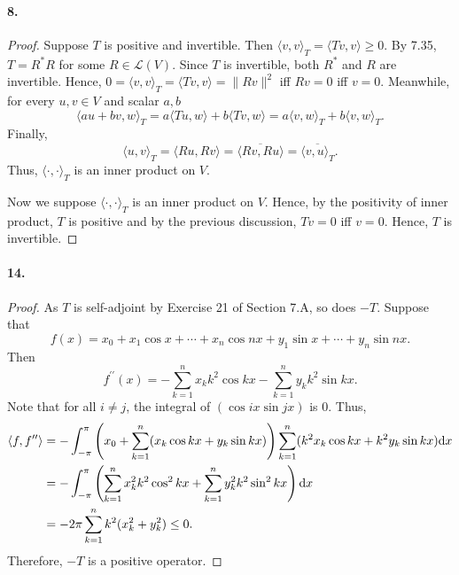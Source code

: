   \paragraph{8.}
  \begin{proof}
    Suppose $T$ is positive and invertible. Then $\langle v,v\rangle_T=\langle
    Tv,v\rangle\ge 0$. By 7.35, $T=R^*R$ for some $R\in\mathcal{L}(V)$. Since
    $T$ is invertible, both $R^*$ and $R$ are invertible. Hence, $0=\langle v,v
    \rangle_T=\langle Tv,v\rangle=\|Rv\|^2$ iff $Rv=0$ iff $v=0$. Meanwhile,
    for every $u,v\in V$ and scalar $a,b$
    \[
      \langle au+bv,w\rangle_T = a\langle Tu,w\rangle + b\langle Tv,w\rangle = 
      a\langle v,w\rangle_T + b\langle v,w\rangle_T.
    \]
    Finally, 
    \[
      \langle u,v\rangle_T = \langle Ru,Rv\rangle = 
      \overline{\langle Rv,Ru\rangle} = \overline{\langle v,u\rangle_T}.
    \]
    Thus, $\langle\cdot,\cdot\rangle_T$ is an inner product on $V$.\par
    Now we suppose $\langle\cdot,\cdot\rangle_T$ is an inner product on $V$.
    Hence, by the positivity of inner product, $T$ is positive and by the 
    previous discussion, $Tv=0$ iff $v=0$. Hence, $T$ is invertible.
  \end{proof}

  \paragraph{14.}
  \begin{proof}
    As $T$ is self-adjoint by Exercise 21 of Section 7.A, so does $-T$.
    Suppose that
    \[
      f(x)=x_0 + x_1\cos x +\cdots+ x_n\cos nx + y_1\sin x +\cdots+ y_n\sin nx.
    \]
    Then
    \[
      f^{\prime\prime}(x)
      = -\sum_{k=1}^nx_kk^2\cos kx - \sum_{k=1}^ny_kk^2\sin kx.
    \]
    Note that for all $i\ne j$, the integral of $(\cos ix\sin jx)$ is $0$. Thus,
    \begin{align*}
      \langle f,f^{\prime\prime}\rangle &= 
      -\int_{-\pi}^\pi
      \left(x_0 + \sum_{k=1}^n(x_k\cos kx + y_k\sin kx) \right)
      \sum_{k=1}^n(k^2x_k\cos kx+ k^2y_k\sin kx)\mathrm{d} x\\
      &= -\int_{-\pi}^\pi\left( \sum_{k=1}^n x_k^2k^2\cos^2kx +
      \sum_{k=1}^ny_k^2k^2\sin^2kx \right)\mathrm{d} x \\
      &= -2\pi\sum_{k=1}^n k^2(x_k^2+y_k^2) \le 0.
    \end{align*}
    Therefore, $-T$ is a positive operator.
  \end{proof}

